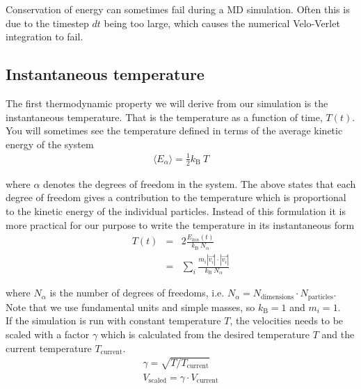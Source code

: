 \documentclass{article}
\begin{document}
Conservation of energy can sometimes fail during a MD simulation.
Often this is due to the timestep $dt$ being too large, which causes the numerical Velo-Verlet integration to fail.

\subsection{Instantaneous temperature}

The first thermodynamic property we will derive from our simulation is the instantaneous temperature.
That is the temperature as a function of time, $T(t)$.
You will sometimes see the temperature defined in terms of the average kinetic energy of the system
\begin{eqnarray}
    \langle E_{\alpha} \rangle = \frac{1}{2} k_\mathrm{B} \ T
\end{eqnarray}

where $\alpha$ denotes the degrees of freedom in the system.
The above states that each degree of freedom gives a contribution to the temperature which is proportional to the kinetic energy of the individual particles.
Instead of this formulation it is more practical for our purpose to write the temperature in its instantaneous form
\begin{eqnarray}
    T(t) &=& 2 \frac{E_{kin}(t)}{k_\mathrm{B} \ N_\alpha }\\
         &=& \sum_i \frac{m_i|\vec{v_i}| \cdot |\vec{v_i}|}{k_\mathrm{B} \ N_\alpha}
\end{eqnarray}

where $N_\alpha$ is the number of degrees of freedoms, i.e. $N_\alpha = N_{\mathrm{dimensions}} \cdot N_{\mathrm{particles}}$. Note that we use fundamental units and simple masses, so $k_\mathrm{B} = 1$ and $m_i = 1$.\\

If the simulation is run with constant temperature $T$, the velocities needs to be scaled with a factor $\gamma$ which is calculated from the desired temperature $T$ and the current temperature $T_\mathrm{current}$.
\begin{eqnarray}
    \gamma = \sqrt{T/T_\mathrm{current}}\\
    \label{eq:temp_factor}
    V_\mathrm{scaled} = \gamma \cdot V_\mathrm{current}
\end{eqnarray}

% 
\end{document}
